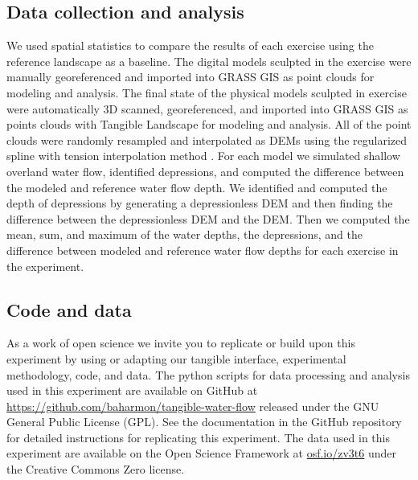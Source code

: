 \documentclass{isprs}
\begin{document}
\subsection{Data collection and analysis}
We used spatial statistics to compare the results of each exercise 
using the reference landscape as a baseline. 
%
The digital models sculpted in the  exercise were manually georeferenced and imported into GRASS GIS as point clouds for modeling and analysis. 
%
The final state of the physical models sculpted in  exercise were automatically 3D scanned, georeferenced, and imported into GRASS GIS as points clouds 
with Tangible Landscape for modeling and analysis. 
%
All of the point clouds were randomly resampled and interpolated as DEMs using the regularized spline with tension interpolation method \cite{Mitasova2005}. 
%
For each model we simulated shallow overland water flow, identified depressions,
and computed the difference between the modeled and reference water flow depth. 
%
We identified and computed the depth of depressions by generating a depressionless DEM and then finding the difference between the depressionless DEM and the DEM.
%
Then we computed the mean, sum, and maximum of the water depths, the depressions, and the difference between modeled and reference water flow depths for each exercise in the experiment. 
%


\subsection{Code and data}

As a work of open science we invite you to
replicate or build upon this experiment by 
using or adapting our tangible interface, experimental methodology, code, and data. 
%
The python scripts for data processing and analysis used in this experiment 
are available on GitHub at \url{https://github.com/baharmon/tangible-water-flow}
released under the GNU General Public License (GPL). 
%
See the documentation in the GitHub repository for detailed instructions for replicating this experiment. 
%
The data used in this experiment are available on the Open Science Framework at \url{osf.io/zv3t6} under the Creative Commons Zero license.
\end{document}
